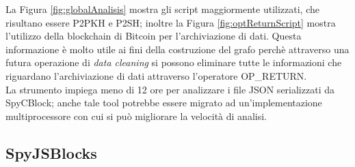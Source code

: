 La Figura \ref{fig:globalAnalisis} mostra gli script maggiormente utilizzati, che risultano essere P2PKH e  P2SH; inoltre la Figura \ref{fig:optReturnScript} mostra l'utilizzo della blockchain di Bitcoin per l'archiviazione di dati. Questa informazione è molto utile ai fini della costruzione del grafo perchè attraverso una futura operazione di \emph{data cleaning} si possono eliminare tutte le informazioni che riguardano l'archiviazione di dati attraverso l'operatore OP\_RETURN.\\
La strumento impiega meno di 12 ore per analizzare i file JSON serializzati da SpyCBlock; anche tale tool potrebbe essere migrato ad un'implementazione multiprocessore con cui si può migliorare la velocità di analisi.

\subsection{SpyJSBlocks} \label{sec:SpyJSBlocks}

